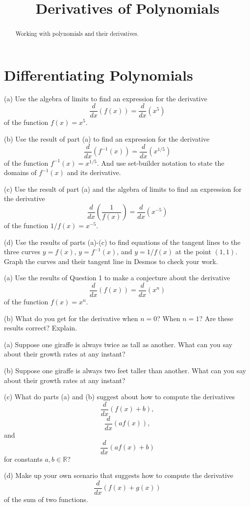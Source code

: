 \documentclass{ximera}
\title{Derivatives of Polynomials}
\begin{document}
\begin{abstract}
Working with polynomials and their derivatives.
\end{abstract}
\maketitle

\section*{Differentiating Polynomials}

\begin{question}  \label{Qdst4hbbh}
(a) Use the algebra of limits to find an expression for the derivative 
\[
     \frac{d}{dx}(f(x)) =   \frac{d}{dx}\left( x^5 \right)
\]
of the function $f(x)=x^5$.

(b) Use the result of part (a) to find an expression for the derivative
\[
    \frac{d}{dx}(f^{-1}(x)) =   \frac{d}{dx}\left( x^{1/5} \right)
\]
of the function $f^{-1}(x) = x^{1/5}$. And use set-builder notation to state the domains of $f^{-1}(x)$ and its derivative. 

(c) Use the result of part (a) and the algebra of limits to find an expression for the derivative
\[
    \frac{d}{dx} \left( \frac{1}{f(x)} \right) =   \frac{d}{dx}\left( x^{-5} \right)
\]
of the function $1/f(x) = x^{-5}$.

(d) Use the results of parts (a)-(c) to find equations of the tangent lines to the three curves $y=f(x)$, $y=f^{-1}(x)$, and $y=1/f(x)$ at the point $(1,1)$. Graph the curves and their tangent line in Desmos to check your work.

\end{question}


\begin{question}  \label{Qdsferewg}
(a) Use the results of Question 1 to make a conjecture about the derivative
\[
     \frac{d}{dx}(f(x)) =   \frac{d}{dx}\left( x^n \right)
\]
of the function $f(x)=x^n$.

(b) What do you get for the derivative when $n=0$? When $n=1$? Are these results correct? Explain.

\end{question}


\begin{question}   \label{Qergh55}
(a) Suppose one giraffe is always twice as tall as another. What can you say about their growth rates at any instant?

(b) Suppose one giraffe is always two feet taller than another. What can you say about their growth rates at any instant?

(c) What do parts (a) and (b) suggest about how to compute the derivatives
\[
   \frac{d}{dx} \left( f(x) + b  \right) ,
\]
\[
   \frac{d}{dx} \left(a f(x) \right) ,
\]
and
\[
    \frac{d}{dx} \left(a f(x) + b  \right)
\]
for constants $a,b\in \mathbb{R}$?

(d) Make up your own scenario that suggests how to compute the derivative
\[
   \frac{d}{dx} \left( f(x) + g(x)  \right) 
\]
of the sum of two functions.
\end{question}
\end{document}
